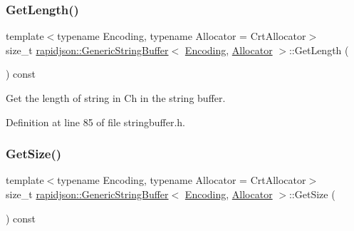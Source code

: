 \subsubsection{\texorpdfstring{GetLength()}{GetLength()}}
{\footnotesize\ttfamily template$<$typename Encoding, typename Allocator = Crt\+Allocator$>$ \\
size\+\_\+t \mbox{\hyperlink{classrapidjson_1_1_generic_string_buffer}{rapidjson\+::\+Generic\+String\+Buffer}}$<$ \mbox{\hyperlink{classrapidjson_1_1_encoding}{Encoding}}, \mbox{\hyperlink{classrapidjson_1_1_allocator}{Allocator}} $>$\+::Get\+Length (\begin{DoxyParamCaption}{ }\end{DoxyParamCaption}) const}



Get the length of string in Ch in the string buffer. 



Definition at line 85 of file stringbuffer.\+h.


\begin{DoxyCode}{0}

\end{DoxyCode}
\mbox{\label{classrapidjson_1_1_generic_string_buffer_a9d830ec37a4ba0fba3b523c90aaf8b42}} 
\subsubsection{\texorpdfstring{GetSize()}{GetSize()}}
{\footnotesize\ttfamily template$<$typename Encoding, typename Allocator = Crt\+Allocator$>$ \\
size\+\_\+t \mbox{\hyperlink{classrapidjson_1_1_generic_string_buffer}{rapidjson\+::\+Generic\+String\+Buffer}}$<$ \mbox{\hyperlink{classrapidjson_1_1_encoding}{Encoding}}, \mbox{\hyperlink{classrapidjson_1_1_allocator}{Allocator}} $>$\+::Get\+Size (\begin{DoxyParamCaption}{ }\end{DoxyParamCaption}) const}



